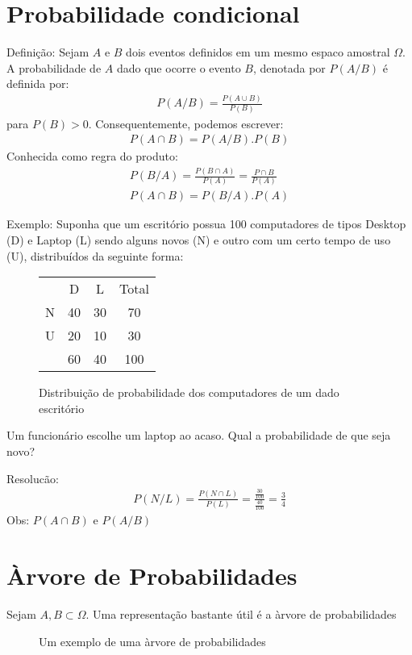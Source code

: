 \documentclass[11pt,a4paper]{book}
\begin{document}
\begin{enumerate}[label=(\alph*)]
\begin{enumerate}
\section{Probabilidade condicional}
Definição: Sejam $A$ e $B$ dois eventos definidos em um mesmo espaco amostral $\Omega$.
A probabilidade de $A$  dado que ocorre o evento $B$, denotada por $P(A/B)$ é definida por:
\begin{align}
  P(A/B)= \frac{P(A\cup B)}{P(B)}
\end{align}
para $P(B)>0$. Consequentemente, podemos escrever:
\begin{align}
  P(A\cap B)= P(A/B).P(B)
\end{align}
Conhecida como regra do produto:
\begin{align}
  P(B/A)= \frac{P(B \cap A)}{P(A)}= \frac{P\cap B}{P(A)}\\
  P(A \cap B)= P(B/A).P(A)
\end{align}

Exemplo: Suponha que um escritório possua 100 computadores de tipos Desktop (D) e 
Laptop (L) sendo alguns novos (N) e outro com um certo tempo de uso (U), distribuídos da seguinte forma:
\begin{figure} 
  \centering
  \begin{tabular}{c c c c}
    \toprule
    &D&L&Total\\ \cmidrule{2-4}
    N&40&30&70\\ \cmidrule{2-4}
    U&20&10&30\\ \cmidrule{2-4}
    &60&40&100 \\\bottomrule
  \end{tabular}
  \label{fig:1}
  \caption{Distribuição de probabilidade dos computadores de um dado escritório}
\end{figure}
Um funcionário escolhe um laptop ao acaso. Qual a probabilidade de que seja novo?

Resolucão: 
\begin{align}
  P(N/L)= \frac{P(N \cap L)}{P(L)}= \frac{\frac{30}{100}}{\frac{40}{100}}=\frac{3}{4}
\end{align}
Obs: $P(A \cap B)$ e $P(A/B)$

\section{Àrvore de Probabilidades}
Sejam $A,B \subset \Omega$. Uma representação bastante útil é a àrvore de probabilidades
\begin{figure}
  \label{fig:2}
  \caption{Um exemplo de uma àrvore de probabilidades}
\end{figure}


\end{enumerate}
\end{enumerate}
\end{document}
